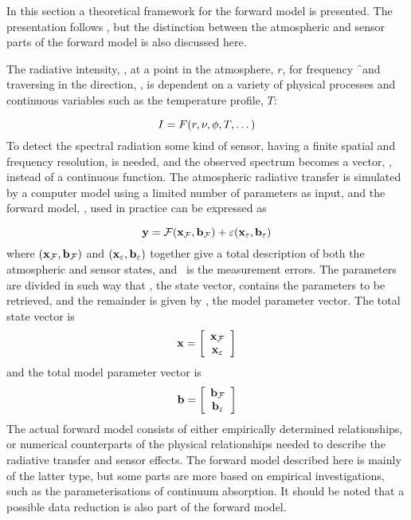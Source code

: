 %
%
In this section a theoretical framework for the forward model is
presented. The presentation follows \citet{rodgers:90}, but the
distinction between the atmospheric and sensor parts of the forward
model is also discussed here.   



 \label{sec:formalism:fm}
 
 The radiative intensity, \mpbi, at a point in the atmosphere, $r$, for
 frequency \f\ and traversing in the direction, \view, is dependent
 on a variety of physical processes and continuous variables such as
 the temperature profile, $T$:

 \begin{equation}
   I = F(r,\nu,\phi,T,\dots)
 \end{equation} 
 To detect the spectral radiation some kind of sensor, having a finite
 spatial and frequency resolution, is needed, and the observed
 spectrum becomes a vector, \y, instead of a continuous function.
 The atmospheric radiative transfer is simulated by a computer model
 using a limited number of parameters as input, and the forward model,
 \fm, used in practice can be expressed as
 
 \begin{equation}
   \mathbf{y} = \mathcal{F}(\mathbf{x}_{\mathcal{F}},\mathbf{b}_{\mathcal{F}}) + \varepsilon(\mathbf{x}_{\varepsilon},\mathbf{b}_{\varepsilon})
  \label{eq:formalism:fm}
 \end{equation}
 where $(\mathbf{x}_{\mathcal{F}},\mathbf{b}_{\mathcal{F}})$ and $(\mathbf{x}_{\varepsilon},\mathbf{b}_{\varepsilon})$ together give a
 total description of both the atmospheric and sensor states, and
 \merr\ is the measurement errors. The parameters are divided in such
 way that \xt, the state vector, contains the parameters to be
 retrieved, and the remainder is given by \bt, the model parameter
 vector. The total state vector is
 \begin{equation}
   \mathbf{x} = \left[ \begin{array}{c} \mathbf{x}_{\mathcal{F}} \\ \mathbf{x}_{\varepsilon} \end{array} \right]
 \end{equation}
 and the total model parameter vector is
 \begin{equation}
   \mathbf{b} = \left[ \begin{array}{c} \mathbf{b}_{\mathcal{F}} \\ \mathbf{b}_{\varepsilon} \end{array} \right]
 \end{equation}
 The actual forward model consists of either empirically determined
 relationships, or numerical counterparts of the physical
 relationships needed to describe the radiative transfer and sensor
 effects. The forward model described here is mainly of the latter
 type, but some parts are more based on empirical investigations, such
 as the parameterisations of continuum absorption. It should be noted
 that a possible data reduction is also part of the forward model.
  
